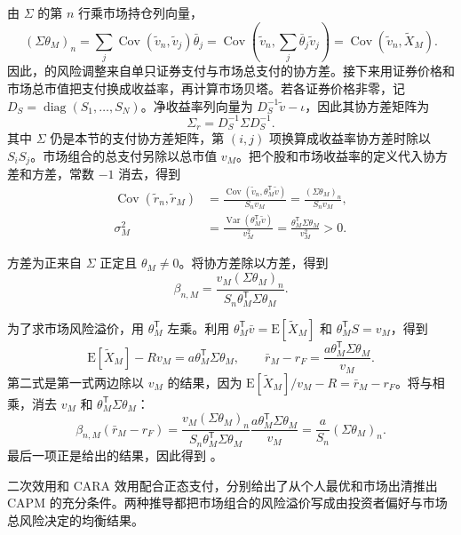 \begin{solution}[label-content={证明},blank-type=none]
由 $\Sigma$ 的第 $n$ 行乘市场持仓列向量，
\[
 (\Sigma\theta_M)_n
 =\sum_j\operatorname{Cov}(\widetilde v_n,\widetilde v_j)\bar\theta_j
 =\operatorname{Cov}\!\left(\widetilde v_n,\sum_j\bar\theta_j\widetilde v_j\right)
 =\operatorname{Cov}(\widetilde v_n,\widetilde X_M).
\]
因此，的风险调整来自单只证券支付与市场总支付的协方差。接下来用证券价格和市场总市值把支付换成收益率，再计算市场贝塔。若各证券价格非零，记 $D_S=\operatorname{diag}(S_1,\ldots,S_N)$。净收益率列向量为 $D_S^{-1}\widetilde v-\iota$，因此其协方差矩阵为
\[
 \Sigma_r=D_S^{-1}\Sigma D_S^{-1}.
\]
其中 $\Sigma$ 仍是本节的支付协方差矩阵，第 $(i,j)$ 项换算成收益率协方差时除以 $S_iS_j$。市场组合的总支付另除以总市值 $v_M$。把个股和市场收益率的定义代入协方差和方差，常数 $-1$ 消去，得到
\[
 \begin{aligned}
 \operatorname{Cov}(\widetilde r_n,\widetilde r_M)
 &=\frac{\operatorname{Cov}(\widetilde v_n,\theta_M^{\mathsf T}\widetilde v)}{S_nv_M}
 =\frac{(\Sigma\theta_M)_n}{S_nv_M},\\
 \sigma_M^2
 &=\frac{\operatorname{Var}(\theta_M^{\mathsf T}\widetilde v)}{v_M^2}
 =\frac{\theta_M^{\mathsf T}\Sigma\theta_M}{v_M^2}>0.
 \end{aligned}
\]

方差为正来自 $\Sigma$ 正定且 $\theta_M\ne0$。将协方差除以方差，得到
\[
 \beta_{n,M}=\frac{v_M(\Sigma\theta_M)_n}{S_n\theta_M^{\mathsf T}\Sigma\theta_M}.
\]

为了求市场风险溢价，用 $\theta_M^{\mathsf T}$ 左乘。利用 $\theta_M^{\mathsf T}\bar v=\mathrm E[\widetilde X_M]$ 和 $\theta_M^{\mathsf T}S=v_M$，得到
\[
 \mathrm E[\widetilde X_M]-Rv_M=a\theta_M^{\mathsf T}\Sigma\theta_M,\qquad
 \bar r_M-r_F=\frac{a\theta_M^{\mathsf T}\Sigma\theta_M}{v_M}.
\]
第二式是第一式两边除以 $v_M$ 的结果，因为 $\mathrm E[\widetilde X_M]/v_M-R=\bar r_M-r_F$。将与相乘，消去 $v_M$ 和 $\theta_M^{\mathsf T}\Sigma\theta_M$：
\[
 \beta_{n,M}(\bar r_M-r_F)
 =\frac{v_M(\Sigma\theta_M)_n}{S_n\theta_M^{\mathsf T}\Sigma\theta_M}
   \frac{a\theta_M^{\mathsf T}\Sigma\theta_M}{v_M}
 =\frac{a}{S_n}(\Sigma\theta_M)_n.
\]
最后一项正是给出的结果，因此得到 。
\end{solution}

二次效用和 CARA 效用配合正态支付，分别给出了从个人最优和市场出清推出 CAPM 的充分条件。两种推导都把市场组合的风险溢价写成由投资者偏好与市场总风险决定的均衡结果。

